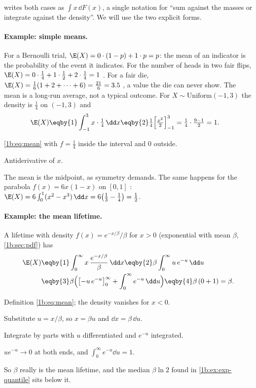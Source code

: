  writes both cases as $\int x\,\dd F(x)$, a single
notation for ``sum against the masses or integrate against the density''.
We will use the two explicit forms.

\paragraph{Example: simple means.}
For a Bernoulli trial, $\E(X)=0\cdot(1-p)+1\cdot p=p$: the mean of an
indicator is the probability of the event it indicates. For the number of
heads in two fair flips, $\E(X)=0\cdot\tfrac14+1\cdot\tfrac12+2\cdot\tfrac14=1$
. For a fair die,
$\E(X)=\tfrac16(1+2+\dots+6)=\tfrac{21}{6}=3.5$ ,
a value the die can never show. The mean is a long-run average, not a
typical outcome. For $X\sim\mathrm{Uniform}(-1,3)$ the density is $\tfrac14$
on $(-1,3)$ and
\begin{align*}
  \E(X)
  &\eqby{1} \int_{-1}^{3}x\cdot\tfrac14\,\dd x
   \eqby{2} \tfrac14\Bigl[\tfrac{x^2}{2}\Bigr]_{-1}^{3}
   = \tfrac14\cdot\tfrac{9-1}{2}=1 .
\end{align*}
\begin{explain}
  \item \eqref{1b:eq:mean} with $f=\tfrac14$ inside the interval and $0$ outside.
  \item Antiderivative of $x$.
\end{explain}
The mean is the midpoint, as symmetry demands. The same happens for the
parabola $f(x)=6x(1-x)$ on $[0,1]$ :
$\E(X)=6\int_0^1(x^2-x^3)\,\dd x=6\bigl(\tfrac13-\tfrac14\bigr)=\tfrac12$.

\paragraph{Example: the mean lifetime.}
A lifetime with density $f(x)=e^{-x/\beta}/\beta$ for $x>0$
(exponential with mean $\beta$, \cref{1b:sec:pdf}) has
\begin{align*}
  \E(X)
  &\eqby{1} \int_0^\infty x\,\frac{e^{-x/\beta}}{\beta}\,\dd x
   \eqby{2} \beta\int_0^\infty u\,e^{-u}\,\dd u \\
  &\eqby{3} \beta\Bigl(\bigl[-u\,e^{-u}\bigr]_0^\infty+\int_0^\infty e^{-u}\,\dd u\Bigr)
   \eqby{4} \beta\,(0+1)=\beta .
\end{align*}
\begin{explain}
  \item Definition \eqref{1b:eq:mean}; the density vanishes for $x<0$.
  \item Substitute $u=x/\beta$, so $x=\beta u$ and $\dd x=\beta\,\dd u$.
  \item Integrate by parts with $u$ differentiated and $e^{-u}$ integrated.
  \item $ue^{-u}\to0$ at both ends, and $\int_0^\infty e^{-u}\dd u=1$.
\end{explain}
So $\beta$ really is the mean lifetime, and the median $\beta\ln2$ found in
\cref{1b:ex:exp-quantile} sits below it.

